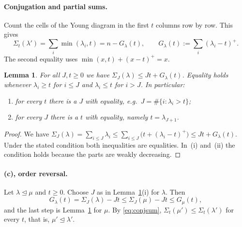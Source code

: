 \documentclass[11pt]{article}
\theoremstyle{plain}
\newtheorem{lemma}[theorem]{Lemma}
\theoremstyle{definition}
\theoremstyle{remark}
\newcommand{\dom}{\trianglelefteq}
\begin{document}
\paragraph{Conjugation and partial sums.} Count the cells of the Young diagram
in the first $t$ columns row by row. This gives
\begin{equation}\label{eq:conjsum}
  \Sigma_t(\lambda')=\sum_i\min(\lambda_i,t)=n-G_\lambda(t),\qquad
  G_\lambda(t):=\sum_i(\lambda_i-t)^+ .
\end{equation}
The second equality uses $\min(x,t)+(x-t)^+=x$.

\begin{lemma}\label{lem:legendre}
For all $J,t\ge0$ we have $\Sigma_J(\lambda)\le Jt+G_\lambda(t)$. Equality holds
whenever $\lambda_i\ge t$ for $i\le J$ and $\lambda_i\le t$ for $i>J$. In
particular:
\begin{enumerate}
  \item[(i)] for every $t$ there is a $J$ with equality, e.g.\
    $J=\#\{i:\lambda_i>t\}$;
  \item[(ii)] for every $J$ there is a $t$ with equality, namely
    $t=\lambda_{J+1}$.
\end{enumerate}
\end{lemma}

\begin{proof}
We have
$\Sigma_J(\lambda)=\sum_{i\le J}\lambda_i\le\sum_{i\le J}\bigl(t+(\lambda_i-t)^+\bigr)
\le Jt+G_\lambda(t)$. Under the stated condition both inequalities are
equalities. In~(i) and~(ii) the condition holds because the parts are weakly
decreasing.
\end{proof}

\paragraph{(c), order reversal.} Let $\lambda\dom\mu$ and $t\ge0$. Choose $J$ as
in Lemma~\ref{lem:legendre}(i) for $\lambda$. Then
\[
  G_\lambda(t)=\Sigma_J(\lambda)-Jt\le\Sigma_J(\mu)-Jt\le G_\mu(t),
\]
and the last step is Lemma~\ref{lem:legendre} for $\mu$. By
\eqref{eq:conjsum}, $\Sigma_t(\mu')\le\Sigma_t(\lambda')$ for every $t$, that is,
$\mu'\dom\lambda'$.
\end{document}
